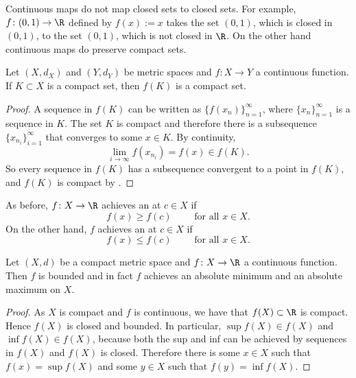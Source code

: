\documentclass[12pt]{book}
\begin{document}
Continuous maps do not map closed sets to closed sets.
For example,
$f \colon (0,1) \to \R$ defined by $f(x) := x$ takes the set $(0,1)$, which
is closed in $(0,1)$, to the set $(0,1)$, which is not closed in $\R$.
On the other hand continuous maps do preserve compact sets.

\begin{lemma} \label{lemma:continuouscompact}
Let $(X,d_X)$ and $(Y,d_Y)$ be metric spaces
and $f \colon X \to Y$ a continuous function.
If
$K \subset X$ is a compact set, then $f(K)$ is a compact set.
\end{lemma}

\begin{proof}
A sequence in $f(K)$ can be written as
$\{ f(x_n) \}_{n=1}^\infty$, where
$\{ x_n \}_{n=1}^\infty$ is a sequence in $K$.
The set $K$ is compact and
therefore there is a subsequence
$\{ x_{n_i} \}_{i=1}^\infty$ that converges to some $x \in K$.
By continuity,
\begin{equation*}
\lim_{i\to\infty} f(x_{n_i}) = f(x) \in f(K) .
\end{equation*}
So every sequence in $f(K)$ has a subsequence convergent to 
a point in $f(K)$, and $f(K)$ is compact by .
\end{proof}

As before, $f \colon X \to \R$ achieves an
\emph{} at $c \in X$ if
\begin{equation*}
f(x) \geq f(c) \qquad \text{ for all $x \in X$.}
\end{equation*}
On the other hand, $f$ achieves an 
\emph{} at $c \in X$ if
\begin{equation*}
f(x) \leq f(c) \qquad \text{ for all $x \in X$.}
\end{equation*}

\begin{thm}
Let $(X,d)$ be a compact metric space
and $f \colon X \to \R$ a continuous function.
Then
$f$ is bounded and in fact
$f$ achieves an absolute minimum and an absolute maximum on $X$.
\end{thm}

\begin{proof}
As $X$ is compact and $f$ is continuous, we have
that $f(X) \subset \R$ is compact.
Hence $f(X)$ is closed
and bounded.
In particular,
$\sup f(X) \in f(X)$ and
$\inf f(X) \in f(X)$, because both the sup and inf
can be achieved by sequences in $f(X)$ and $f(X)$ is closed.
Therefore there is some $x \in X$ such that $f(x) = \sup f(X)$
and some $y \in X$ such that $f(y) = \inf f(X)$.
\end{proof}
\end{document}
